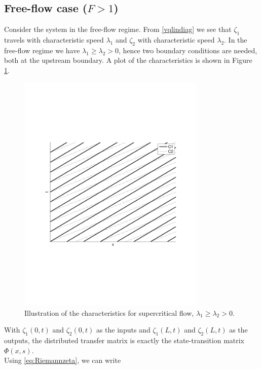 \documentclass[preprint]{elsarticle}
\begin{document}
\subsection{Free-flow case ($F>1$)}
Consider the system in the free-flow regime. From \eqref{vqlindiag} we see that $\zeta_1$ travels with characteristic speed $\lambda_1$ and $\zeta_2$ with characteristic speed $\lambda_2$. In the free-flow regime we have $\lambda_1 \geq \lambda_2 > 0$, hence two boundary conditions are needed, both at the upstream boundary. A plot of the characteristics is shown in Figure \ref{fig:supercr}.

\begin{figure}[H] 
\centering
\includegraphics[trim= 0mm 75mm 0mm 70mm, width = 90mm]{supercr}
\caption{Illustration of the characteristics for supercritical flow, $\lambda_1 \geq \lambda_2 > 0$.}
\label{fig:supercr}
\end{figure}

With $\zeta_1 (0,t)$ and $\zeta_2 (0,t)$ as the inputs and $\zeta_1(L,t)$ and $\zeta_2(L,t)$ as the outputs, the distributed transfer matrix is exactly the state-transition matrix $\Phi(x,s)$.\\

Using \eqref{eq:Riemannzeta}, we can write
\end{document}
